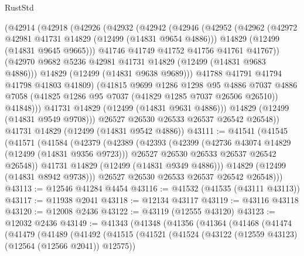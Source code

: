 \begin{lexlean}{RustStd}
\begin{coremodule}
{\begin{coremodule}
{{{{{{{{{{{{{{{{{{{{{{{{{{{{{{{{{{{{{{{{{{{{{{{{{{{{{{{{{{{{{{{{{{{{{{{{{{{{{{{{          (@42914
            (@42918
              (@42926
                (@42932
                  (@42942
                    (@42946
                      (@42952
                        (@42962
                          (@42972 @42981 @41731 @14829 (@12499 (@14831 @9654 @4886)))
                          @14829
                          (@12499 (@14831 @9645 @9665)))
                        @41746
                        @41749
                        @41752
                        @41756
                        @41761
                        @41767))
                    (@42970 @9682 @5236 @42981 @41731 @14829 (@12499 (@14831 @9683 @4886)))
                    @14829
                    (@12499 (@14831 @9638 @9689)))
                  @41788
                  @41791
                  @41794
                  @41798
                  @41803
                  @41809)
                (@41815
                  @9699
                  @1286
                  @1298
                  @95
                  @4886
                  @7037
                  @4886
                  @7058
                  (@41825 @1286 @95 @7037 (@41829 @1285 @7037 @26506 @26510))
                  @41848)))
            @41731
            @14829
            (@12499 (@14831 @9631 @4886)))
          @14829
          (@12499 (@14831 @9549 @9708)))
        @26527
        @26530
        @26533
        @26537
        @26542
        @26548))
    @41731
    @14829
    (@12499 (@14831 @9542 @4886))
@43111 := @41541
    (@41545
      (@41571
        (@41584
          (@42379
            (@42389
              (@42393
                (@42399
                  (@42736 @43074 @14829 (@12499 (@14831 @9356 @9723)))
                  @26527
                  @26530
                  @26533
                  @26537
                  @26542
                  @26548))
              @41731
              @14829
              (@12499 (@14831 @9349 @4886)))
            @14829
            (@12499 (@14831 @8942 @9738)))
          @26527
          @26530
          @26533
          @26537
          @26542
          @26548)))
@43113 := @12546 @41284 @4454
@43116 := @41532 (@41535 (@43111 @43113))
@43117 := @11938 @2041
@43118 := @12134 @43117
@43119 := @43116 @43118
@43120 := @12008 @2436
@43122 := @43119 (@12555 @43120)
@43123 := @12032 @2436
@43149 := @41343
    (@41348
      (@41356
        (@41364
          (@41468
            (@41474
              (@41479
                (@41489
                  (@41492
                    (@41515
                      (@41521
                        (@41524 (@43122 (@12559 @43123) (@12564 (@12566 @2041)) @12575))
}}}}}}}}}}}}}}}}}}}}}}}}}}}}}}}}}}}}}}}}}}}}}}}}}}}}}}}}}}}}}}}}}}}}}}}}}}}}}}}}
\end{coremodule}}
\end{coremodule}
\end{lexlean}
